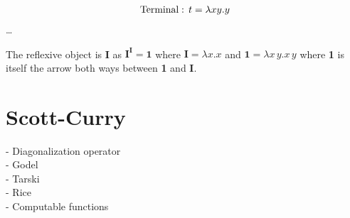 \documentclass[a4paper,10pt]{article}
\begin{document}
\begin{align*}
    &\textnormal{Terminal}: \, t = \lambda x y . y \\
\end{align*}
\ldots

The reflexive object is \textbf{I} as $\textbf{I}^\textbf{I} = \textbf{1}$ where
$\textbf{I} = \lambda x.x$ and $\textbf{1} = \lambda x \, y . x \, y$ where
\textbf{1} is itself the arrow both ways between \textbf{1} and \textbf{I}.

\section{Scott-Curry}
  - Diagonalization operator \\
  - Godel \\
  - Tarski \\
  - Rice \\
  - Computable functions \\
\end{document}
